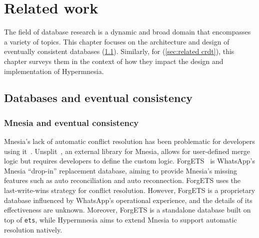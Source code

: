 \section{Related work} \label{sec:eval}



The field of database research is a dynamic and broad domain that encompasses a
variety of topics. This chapter focuses on the architecture and design of eventually 
consistent databases (\cref{sec:related db}).
Similarly, for  (\cref{sec:related crdt}), this chapter surveys 
them in the context of how they impact the design and implementation of Hypermnesia.


\subsection{Databases and eventual consistency} \label{sec:related db}

\subsubsection{Mnesia and eventual consistency}

Mnesia's lack of automatic conflict resolution has been problematic for developers 
using it~\cite{mineiro2008DukesofErl,wiger2010unsplitmail}. 
Unsplit~\cite{wiger2023unsplit}, an external library for Mnesia, allows for user-defined
merge logic but requires developers to define the custom logic.
ForgETS~\cite{vorontsov2018forgETS} is WhatsApp's Mnesia ``drop-in'' replacement
database, aiming to provide Mnesia's missing features such as auto reconciliation and auto
reconnection. ForgETS uses the last-write-wins strategy for conflict resolution.
However, ForgETS is a proprietary database influenced by WhatsApp's operational
experience, and the details of its effectiveness are unknown. Moreover, ForgETS
is a standalone database built on top of \texttt{ets}, while
Hypermnesia aims to extend Mnesia to support automatic resolution natively.



